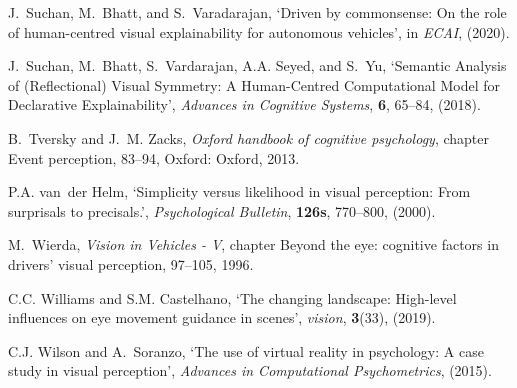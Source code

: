 \documentclass[a4paper]{article}
\begin{document}
\begin{thebibliography}{10}
J.~Suchan, M.~Bhatt, and S.~Varadarajan, `Driven by commonsense: On the role of
  human-centred visual explainability for autonomous vehicles', in {\em ECAI},
  (2020).

J.~Suchan, M.~Bhatt, S.~Vardarajan, A.A. Seyed, and S.~Yu, `{Semantic Analysis
  of (Reflectional) Visual Symmetry: {A} Human-Centred Computational Model for
  Declarative Explainability}', {\em Advances in Cognitive Systems}, {\bf 6},
  65--84, (2018).

B.~Tversky and J.~M. Zacks, {\em Oxford handbook of cognitive psychology},
  chapter Event perception,  83--94, Oxford: Oxford, 2013.

P.A. van~der Helm, `Simplicity versus likelihood in visual perception: From
  surprisals to precisals.', {\em Psychological Bulletin}, {\bf 126s},
  770--800, (2000).

M.~Wierda, {\em Vision in Vehicles - V}, chapter Beyond the eye: cognitive
  factors in drivers' visual perception,  97--105, 1996.

C.C. Williams and S.M. Castelhano, `The changing landscape: High-level
  influences on eye movement guidance in scenes', {\em vision}, {\bf 3}(33),
  (2019).

C.J. Wilson and A.~Soranzo, `The use of virtual reality in psychology: A case
  study in visual perception', {\em Advances in Computational Psychometrics},
  (2015).

\end{thebibliography}
\end{document}

